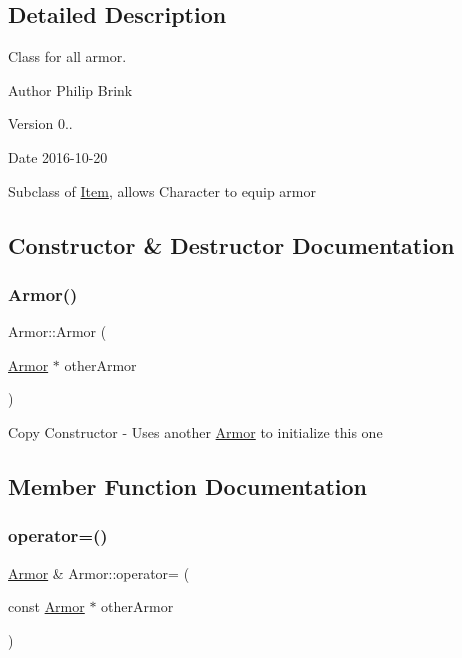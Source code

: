 \subsection{Detailed Description}
Class for all armor. 

\begin{DoxyAuthor}{Author}
Philip Brink 
\end{DoxyAuthor}
\begin{DoxyVersion}{Version}
0.. 
\end{DoxyVersion}
\begin{DoxyDate}{Date}
2016-\/10-\/20
\end{DoxyDate}
Subclass of \hyperlink{class_item}{Item}, allows Character to equip armor 

\subsection{Constructor \& Destructor Documentation}
\hypertarget{class_armor_abee983c0e4e8fd5a5d3fccebc6d079dc}{}\label{class_armor_abee983c0e4e8fd5a5d3fccebc6d079dc} 
\subsubsection{\texorpdfstring{Armor()}{Armor()}}
{\footnotesize\ttfamily Armor\+::\+Armor (\begin{DoxyParamCaption}\item[{\hyperlink{class_armor}{Armor} $\ast$}]{other\+Armor }\end{DoxyParamCaption})}

Copy Constructor -\/ Uses another \hyperlink{class_armor}{Armor} to initialize this one 

\subsection{Member Function Documentation}
\hypertarget{class_armor_a167690954e4ccd6c4fd9adfed24bc132}{}\label{class_armor_a167690954e4ccd6c4fd9adfed24bc132} 
\subsubsection{\texorpdfstring{operator=()}{operator=()}}
{\footnotesize\ttfamily \hyperlink{class_armor}{Armor} \& Armor\+::operator= (\begin{DoxyParamCaption}\item[{const \hyperlink{class_armor}{Armor} $\ast$}]{other\+Armor }\end{DoxyParamCaption})}

